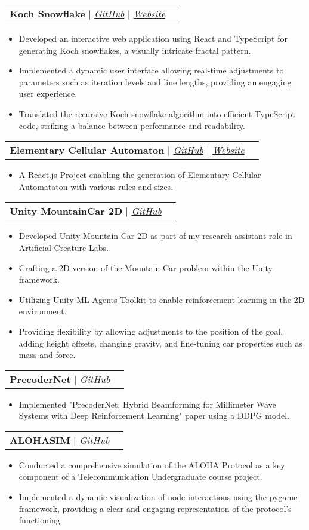 \documentclass[letterpaper,11pt]{article}
\makeatletter
\newcommand{\resumeItem}[1]{
  \item\small{
    {#1 \vspace{-2pt}}
  }
}
\newcommand{\resumeProjectHeading}[2]{
    \vspace{-2pt}\item
    \begin{tabular*}{0.97\textwidth}{l@{\extracolsep{\fill}}r}
      \small#1 & #2 \\
    \end{tabular*}\vspace{-7pt}
}
\newcommand{\resumeItemListStart}{\begin{itemize}}
\newcommand{\resumeItemListEnd}{\end{itemize}\vspace{-5pt}}
\makeatother
\begin{document}
\resumeProjectHeading
{
	\textbf{Koch Snowflake}
	$|$ \emph{\href{https://github.com/mhyrzt/KochSnowFlake}{\color{blue}GitHub}}
	$|$ \emph{\href{https://mhyrzt.github.io/KochSnowFlake/}{\color{blue}Website}}
}
{}
\resumeItemListStart
\resumeItem{Developed an interactive web application using React and TypeScript for generating Koch snowflakes, a visually intricate fractal pattern.}
\resumeItem{Implemented a dynamic user interface allowing real-time adjustments to parameters such as iteration levels and line lengths, providing an engaging user experience.}
\resumeItem{Translated the recursive Koch snowflake algorithm into efficient TypeScript code, striking a balance between performance and readability.}
\resumeItemListEnd

\resumeProjectHeading
{
	\textbf{Elementary Cellular Automaton}
	$|$ \emph{\href{https://github.com/mhyrzt/elementary-cellular-automaton}{\color{blue}GitHub}}
	$|$ \emph{\href{https://mhyrzt.github.io/elementary-cellular-automaton/}{\color{blue}Website}}
}
{}
\resumeItemListStart
\resumeItem{A React.js Project enabling the generation of \href{https://en.wikipedia.org/wiki/Elementary_cellular_automaton}{\color{blue} Elementary Cellular Automataton} with various rules and sizes. }
\resumeItemListEnd

\resumeProjectHeading
{\textbf{Unity MountainCar 2D} $|$ \emph{\href{https://github.com/mhyrzt/UnityMountainCar2D}{\color{blue}GitHub}}}{}
\resumeItemListStart
\resumeItem{Developed Unity Mountain Car 2D as part of my research assistant role in Artificial Creature Labs.}
\resumeItem{Crafting a 2D version of the Mountain Car problem within the Unity framework.}
\resumeItem{Utilizing Unity ML-Agents Toolkit to enable reinforcement learning in the 2D environment.}
\resumeItem{Providing flexibility by allowing adjustments to the position of the goal, adding height offsets, changing gravity, and fine-tuning car properties such as mass and force.}
\resumeItemListEnd


\resumeProjectHeading
{\textbf{PrecoderNet} $|$ \emph{\href{https://github.com/mhyrzt/PrecoderNet}{\color{blue}GitHub}}}{}
\resumeItemListStart
\resumeItem{Implemented "PrecoderNet: Hybrid Beamforming for Millimeter Wave Systems with Deep Reinforcement Learning" paper using a DDPG model.}
\resumeItemListEnd

\resumeProjectHeading
{\textbf{ALOHASIM} $|$ \emph{\href{https://github.com/mhyrzt/ALOHASIM}{\color{blue}GitHub}}}{}
\resumeItemListStart
\resumeItem{Conducted a comprehensive simulation of the ALOHA Protocol as a key component of a Telecommunication Undergraduate course project.}
\resumeItem{Implemented a dynamic visualization of node interactions using the pygame framework, providing a clear and engaging representation of the protocol's functioning.}
\resumeItemListEnd
\end{document}
